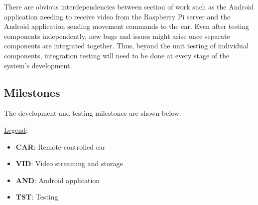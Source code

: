 \documentclass[letterpaper,12pt]{report}
\begin{document}
	There are obvious interdependencies between section of work such as the
	Android application needing to receive video from the Raspberry Pi server
	and the Android application sending movement commands to the car. Even after
	testing components independently, new bugs and issues might arise once
	separate components are integrated together. Thus, beyond the unit testing
	of individual components, integration testing will need to be done at every
	stage of the system’s development.

	\subsection*{Milestones}
	\markright{}
	The development and testing milestones are shown below.\par

	\underline{Legend}:

	\setlength{\parskip}{0em}
	\setlength{\baselineskip}{1em}

	\begin{itemize}
		\item[] \textbf{CAR}: Remote-controlled car
		\item[] \textbf{VID}: Video streaming and storage
		\item[] \textbf{AND}: Android application
		\item[] \textbf{TST}: Testing
	\end{itemize}\vspace{1em}
\end{document}

